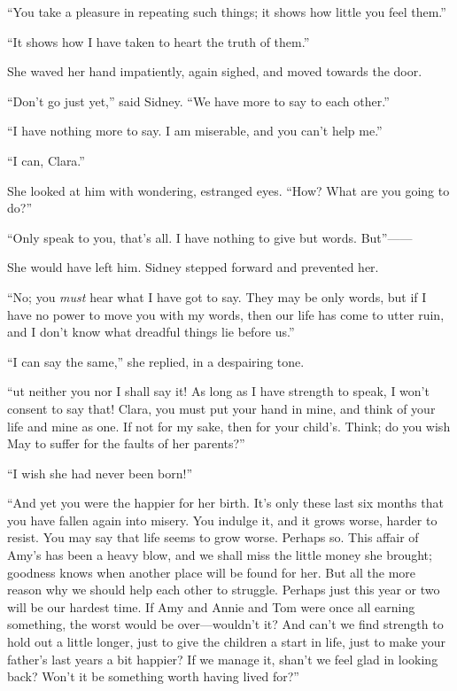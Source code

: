 ``You take a pleasure in repeating such things; it shows how little you
feel them.''

``It shows how I have taken to heart the truth of them.''

She waved her hand impatiently, again sighed, and moved towards the
door.

``Don't go just yet,'' said Sidney. ``We have more to say to each
other.''

``I have nothing more to say. I am miserable, and you can't help me.''

``I can, Clara.''

She looked at him with wondering, estranged eyes. ``How? What are you
going to do?''

``Only speak to you, that's all. I have nothing to give but words.
But''{{------}}

{}She would have left him. Sidney stepped forward and prevented her.

``No; you \emph{must} hear what I have got to say. They may be only
words, but if I have no power to move you with my words, then our life
has come to utter ruin, and I don't know what dreadful things lie before
us.''

``I can say the same,'' she replied, in a despairing tone.

``ut neither you nor I shall say it! As long as I have strength to
speak, I won't consent to say that! Clara, you must put your hand in
mine, and think of your life and mine as one. If not for my sake, then
for your child's. Think; do you wish May to suffer for the faults of her
parents?''

``I wish she had never been born!''

``And yet you were the happier for her birth. It's only these last six
months that you have fallen again into misery. You indulge it, and it
grows worse, harder to resist. You may say that life seems to grow
worse. Perhaps so. This affair of Amy's has been a heavy blow, and we
shall miss the little money she brought; goodness knows when another
place will be found for her. But all the more {}reason why we should
help each other to struggle. Perhaps just this year or two will be our
hardest time. If Amy and Annie and Tom were once all earning something,
the worst would be over---wouldn't it? And can't we find strength to
hold out a little longer, just to give the children a start in life,
just to make your father's last years a bit happier? If we manage it,
shan't we feel glad in looking back? Won't it be something worth having
lived for?''

